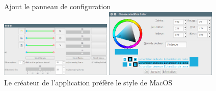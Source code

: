\documentclass[12pt,a4paper]{article}
\begin{document}
\begin{enumerate}
\begin{center}
	Ajout le panneau de configuration\\
	\includegraphics[width=0.4\textwidth]{13.png}
	\includegraphics[width=0.4\textwidth]{14.png}\\
	Le créateur de l'application préfère le style de MacOS
\end{center}
\end{enumerate}
\end{document}
